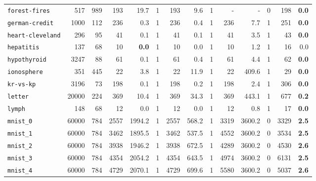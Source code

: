\begin{tabular}{lccrrrrrrrrrrr}
\texttt{forest-fires} & \multicolumn{1}{r}{517} & \multicolumn{1}{r}{989}  & 193 & 19.7 & 1 & 193 & 9.6 & 1 & - & - & 0 & 198 & \textbf{0.0}\\
\texttt{german-credit} & \multicolumn{1}{r}{1000} & \multicolumn{1}{r}{112}  & 236 & 0.3 & 1 & 236 & 0.4 & 1 & 236 & 7.7 & 1 & 251 & \textbf{0.0}\\
\texttt{heart-cleveland} & \multicolumn{1}{r}{296} & \multicolumn{1}{r}{95}  & 41 & 0.1 & 1 & 41 & 0.1 & 1 & 41 & 3.5 & 1 & 43 & \textbf{0.0}\\
\texttt{hepatitis} & \multicolumn{1}{r}{137} & \multicolumn{1}{r}{68}  & 10 & \textbf{0.0} & 1 & 10 & 0.0 & 1 & 10 & 1.2 & 1 & 16 & 0.0\\
\texttt{hypothyroid} & \multicolumn{1}{r}{3247} & \multicolumn{1}{r}{88}  & 61 & 0.1 & 1 & 61 & 0.4 & 1 & 61 & 4.4 & 1 & 62 & \textbf{0.0}\\
\texttt{ionosphere} & \multicolumn{1}{r}{351} & \multicolumn{1}{r}{445}  & 22 & 3.8 & 1 & 22 & 11.9 & 1 & 22 & 409.6 & 1 & 29 & \textbf{0.0}\\
\texttt{kr-vs-kp} & \multicolumn{1}{r}{3196} & \multicolumn{1}{r}{73}  & 198 & 0.1 & 1 & 198 & 0.2 & 1 & 198 & 2.4 & 1 & 306 & \textbf{0.0}\\
\texttt{letter} & \multicolumn{1}{r}{20000} & \multicolumn{1}{r}{224}  & 369 & 10.4 & 1 & 369 & 34.3 & 1 & 369 & 443.1 & 1 & 677 & \textbf{0.2}\\
\texttt{lymph} & \multicolumn{1}{r}{148} & \multicolumn{1}{r}{68}  & 12 & 0.0 & 1 & 12 & 0.0 & 1 & 12 & 0.8 & 1 & 17 & \textbf{0.0}\\
\texttt{mnist\_0} & \multicolumn{1}{r}{60000} & \multicolumn{1}{r}{784}  & 2557 & 1994.2 & 1 & 2557 & 568.2 & 1 & 3319 & 3600.2 & 0 & 3329 & \textbf{2.5}\\
\texttt{mnist\_1} & \multicolumn{1}{r}{60000} & \multicolumn{1}{r}{784}  & 3462 & 1895.5 & 1 & 3462 & 537.5 & 1 & 4552 & 3600.2 & 0 & 3534 & \textbf{2.5}\\
\texttt{mnist\_2} & \multicolumn{1}{r}{60000} & \multicolumn{1}{r}{784}  & 3938 & 1946.2 & 1 & 3938 & 672.5 & 1 & 4289 & 3600.2 & 0 & 4530 & \textbf{2.6}\\
\texttt{mnist\_3} & \multicolumn{1}{r}{60000} & \multicolumn{1}{r}{784}  & 4354 & 2054.2 & 1 & 4354 & 643.5 & 1 & 4974 & 3600.2 & 0 & 6131 & \textbf{2.5}\\
\texttt{mnist\_4} & \multicolumn{1}{r}{60000} & \multicolumn{1}{r}{784}  & 4729 & 2070.1 & 1 & 4729 & 699.6 & 1 & 5580 & 3600.2 & 0 & 5037 & \textbf{2.6}\\

\end{tabular}
